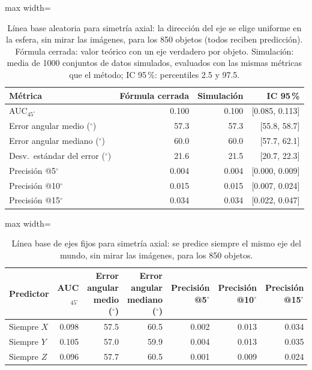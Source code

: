 
\begin{table}[htbp]
\centering
\caption{Línea base aleatoria para simetría axial: la dirección del eje se elige uniforme en la esfera, sin mirar las imágenes, para los 850 objetos (todos reciben predicción). Fórmula cerrada: valor teórico con un eje verdadero por objeto. Simulación: media de 1000 conjuntos de datos simulados, evaluados con las mismas métricas que el método; IC 95\,\%: percentiles 2.5 y 97.5.}
\label{tab:base_axis_azar}
\begin{adjustbox}{max width=\textwidth}
\begin{tabular}{lrrr}
\toprule
Métrica & Fórmula cerrada & Simulación & IC 95\,\% \\
\midrule
AUC$_{45^\circ}$ & 0.100 & 0.100 & [0.085, 0.113] \\
Error angular medio ($^\circ$) & 57.3 & 57.3 & [55.8, 58.7] \\
Error angular mediano ($^\circ$) & 60.0 & 60.0 & [57.7, 62.1] \\
Desv.\ estándar del error ($^\circ$) & 21.6 & 21.5 & [20.7, 22.3] \\
Precisión @5$^\circ$ & 0.004 & 0.004 & [0.000, 0.009] \\
Precisión @10$^\circ$ & 0.015 & 0.015 & [0.007, 0.024] \\
Precisión @15$^\circ$ & 0.034 & 0.034 & [0.022, 0.047] \\
\bottomrule
\end{tabular}
\end{adjustbox}
\end{table}

\begin{table}[htbp]
\centering
\caption{Línea base de ejes fijos para simetría axial: se predice siempre el mismo eje del mundo, sin mirar las imágenes, para los 850 objetos.}
\label{tab:base_axis_fijos}
\begin{adjustbox}{max width=\textwidth}
\begin{tabular}{lrrrrrr}
\toprule
Predictor & AUC$_{45^\circ}$ & Error angular medio ($^\circ$) & Error angular mediano ($^\circ$) & Precisión @5$^\circ$ & Precisión @10$^\circ$ & Precisión @15$^\circ$ \\
\midrule
Siempre $X$ & 0.098 & 57.5 & 60.5 & 0.002 & 0.013 & 0.034 \\
Siempre $Y$ & 0.105 & 57.0 & 59.9 & 0.004 & 0.013 & 0.035 \\
Siempre $Z$ & 0.096 & 57.7 & 60.5 & 0.001 & 0.009 & 0.024 \\
\bottomrule
\end{tabular}
\end{adjustbox}
\end{table}

